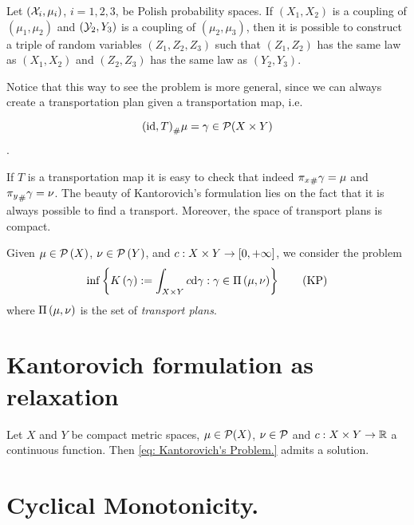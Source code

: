 \begin{lemma} Let $(\mathcal{X}_i , \mu_i)$, $i = 1, 2, 3$,  be Polish probability spaces. If $(X_1 , X_2)$ is a coupling of $(\mu_1, \mu_2 )$ and $(\mathcal{Y}_2 , Y_3)$ is a coupling of $(\mu_2, \mu_3)$, then it is possible to construct a triple of random variables $(Z_1 , Z_2, Z_3)$ such that $(Z_1, Z_2)$ has the same law as $(X_1 , X_2)$ and $(Z_2, Z_3)$ has the same law as $(Y_2 , Y_3)$.
\end{lemma}

Notice that this way to see the problem is more general, since we can always create a transportation plan given a transportation map, i.e. 

\begin{equation*}
{(\mathrm{id}, T)}_{\#} \mu=\gamma \in \mathcal{P}(X\times Y)
\end{equation*}. 

If $T$ is a transportation map it is easy to check that indeed ${\pi_x}_{\#} \gamma=\mu$ and ${\pi_y}_{\#} \gamma=\nu$. The beauty of Kantorovich's formulation lies on the fact that it is always possible to find a transport. Moreover, the space of transport plans is compact.


\begin{problem}Given $\mu \in \mathcal{P}\left( X \right)$, $\nu \in \mathcal{P}\left( Y \right)$, and $c: X\times Y \rightarrow \left[ 0, +\infty \right]$, we consider the problem
	\begin{equation}
		\inf\left\lbrace K\left(\gamma\right) := \int_{X\times Y} c \mathrm{d}\gamma : \gamma \in \Pi\left(\mu, \nu\right) \right\rbrace\label{eq: Kantorovich's Problem.}\tag{KP}
	\end{equation}
where $\Pi\left(\mu, \nu\right)$ is the set of \textit{transport plans}.
\end{problem}




\section{Kantorovich formulation as relaxation}

\begin{theorem}
	Let $X$ and $Y$ be compact metric spaces, $\mu \in \mathcal{P}(X)$, $\nu \in  \mathcal{P}$ and
	$c:X\times Y \rightarrow \mathbb{R}$  a continuous function. Then  \eqref{eq: Kantorovich's Problem.} admits a solution.
\end{theorem} 

\section{Cyclical Monotonicity.}

